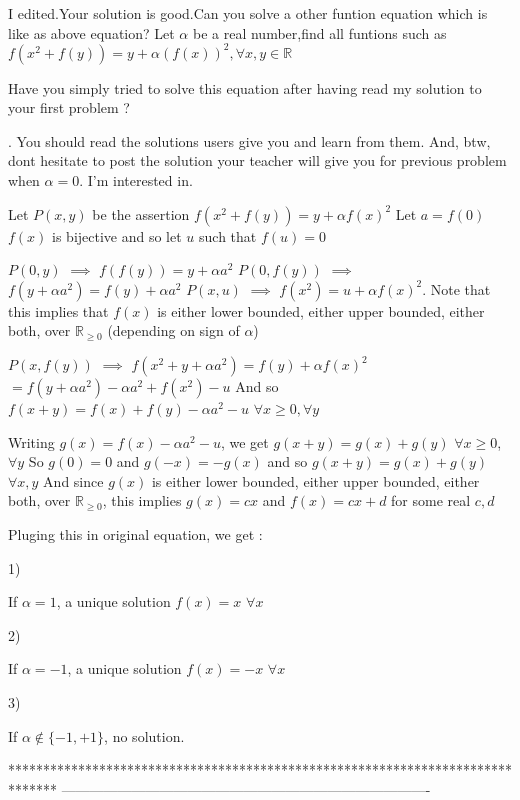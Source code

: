 \begin{solution}
	\begin{tcolorbox}I edited.Your solution is good.Can you solve a other funtion equation which is like as above equation?
Let $\alpha$ be a real number,find all funtions such as
$f\left(x^2+f\left(y\right)\right)=y+\alpha\left(f\left(x\right)\right)^2,\forall x,y\in\mathbb{R}$\end{tcolorbox}
Have you simply tried to solve this equation after having read my solution to your first problem ? 
.
You should read the solutions users give you and learn from them.
And, btw, dont hesitate to post the solution your teacher will give you for previous problem when $\alpha=0$. I'm interested in.

 
Let $P(x,y)$ be the assertion $f(x^2+f(y))=y+\alpha f(x)^2$
Let $a=f(0)$
$f(x)$ is bijective and so let $u$ such that $f(u)=0$

$P(0,y)$ $\implies$ $f(f(y))=y+\alpha a^2$
$P(0,f(y))$ $\implies$ $f(y+\alpha a^2)=f(y)+\alpha a^2$
$P(x,u)$ $\implies$ $f(x^2)=u+\alpha f(x)^2$. Note that this implies that $f(x)$ is either lower bounded, either upper bounded, either both, over $\mathbb R_{\ge 0}$ (depending on sign of $\alpha$)

$P(x,f(y))$ $\implies$ $f(x^2+y+\alpha a^2)=f(y)+\alpha f(x)^2$ $=f(y+\alpha a^2)-\alpha a^2+f(x^2)-u$
And so $f(x+y)=f(x)+f(y)-\alpha a^2-u$ $\forall x\ge 0,\forall y$

Writing $g(x)=f(x)-\alpha a^2-u$, we get $g(x+y)=g(x)+g(y)$ $\forall x\ge 0$, $\forall y$
So $g(0)=0$ and $g(-x)=-g(x)$ and so $g(x+y)=g(x)+g(y)$ $\forall x,y$
And since $g(x)$ is either lower bounded, either upper bounded, either both, over $\mathbb R_{\ge 0}$, this implies $g(x)=cx$ and $f(x)=cx+d$ for some real $c,d$

Pluging this in original equation, we get :
\begin{bolded}1)\end{bolded} If $\alpha =1$, a unique solution $f(x)=x$ $\forall x$
\begin{bolded}2)\end{bolded} If $\alpha=-1$, a unique solution $f(x)=-x$ $\forall x$
\begin{bolded}3)\end{bolded} If $\alpha\notin\{-1,+1\}$, no solution.
\end{solution}
*******************************************************************************
-------------------------------------------------------------------------------

